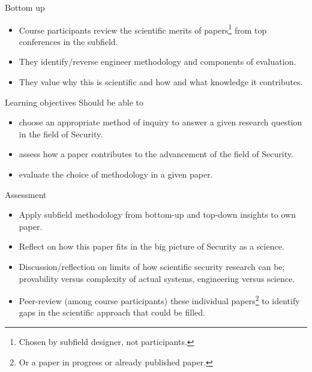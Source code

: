 \begin{frame}
  \begin{block}{Bottom up}
    \begin{itemize}
      \item Course participants review the scientific merits of 
        papers\footnote{%
          Chosen by subfield designer, not participants.
        } from top conferences in the subfield.

      \item They identify/reverse engineer methodology and components of 
        evaluation.

      \item They value why this is scientific and how and what knowledge it 
        contributes.
    \end{itemize}
  \end{block}
\end{frame}

\begin{frame}
  \begin{block}{Learning objectives}
    Should be able to
    \begin{itemize}
      \item choose an appropriate method of inquiry to answer a given research 
        question in the field of Security.

      \item assess how a paper contributes to the advancement of the field of 
        Security.

      \item evaluate the choice of methodology in a given paper.
    \end{itemize}
  \end{block}
\end{frame}

\begin{frame}[allowframebreaks]
  \begin{block}{Assessment}
    \begin{itemize}
      \item Apply subfield methodology from bottom-up and top-down
        insights to own paper.

      \item Reflect on how this paper fits in the big picture of Security as a 
        science.

      \item Discussion/reflection on limits of how scientific security research 
        can be; \eg provability versus complexity of actual systems, 
        engineering versus science.

      \item Peer-review (among course participants) these individual 
        papers\footnote{%
          Or a paper in progress or already published paper.
        } to identify gaps in the scientific approach that could be filled.
    \end{itemize}
  \end{block}
\end{frame}

